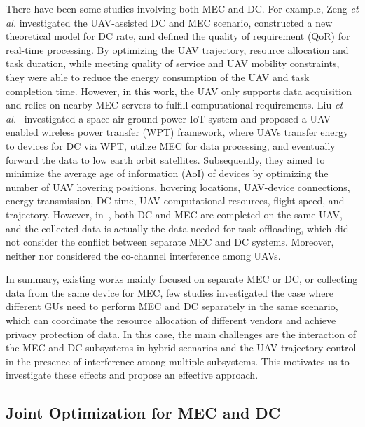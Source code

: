 \par There have been some studies involving both MEC and DC. For example, Zeng \textit{et al.} \cite{Zeng2023} investigated the UAV-assisted DC and MEC scenario, constructed a new theoretical model for DC rate, and defined the quality of requirement (QoR) for real-time processing. By optimizing the UAV trajectory, resource allocation and task duration, while meeting quality of service and UAV mobility constraints, they were able to reduce the energy consumption of the UAV and task completion time. However, in this work, the UAV only supports data acquisition and relies on nearby MEC servers to fulfill computational requirements. Liu \textit{et al.}~\cite{Liu2024a} investigated a space-air-ground power IoT system and proposed a UAV-enabled wireless power transfer (WPT) framework, where UAVs transfer energy to devices for DC via WPT, utilize MEC for data processing, and eventually forward the data to low earth orbit satellites. Subsequently, they aimed to minimize the average age of information (AoI) of devices by optimizing the number of UAV hovering positions, hovering locations, UAV-device connections, energy transmission, DC time, UAV computational resources, flight speed, and trajectory. However, in~\cite{Liu2024a}, both DC and MEC are completed on the same UAV, and the collected data is actually the data needed for task offloading, which did not consider the conflict between separate MEC and DC systems. Moreover, neither \cite{Zeng2023} nor \cite{Liu2024a} considered the co-channel interference among UAVs.

\par In summary, existing works mainly focused on separate MEC or DC, or collecting data from the same device for MEC, few studies investigated the case where different GUs need to perform MEC and DC separately in the same scenario, which can coordinate the resource allocation of different vendors and achieve privacy protection of data. In this case, the main challenges are the interaction of the MEC and DC subsystems in hybrid scenarios and the UAV trajectory control in the presence of interference among multiple subsystems. This motivates us to investigate these effects and propose an effective approach.


\subsection{Joint Optimization for MEC and DC}

